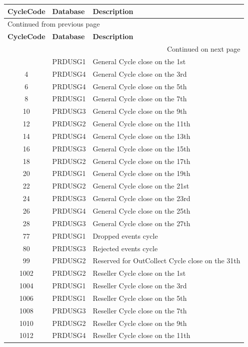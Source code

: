 \documentclass[12pt,twoside]{article}
\begin{document}
\begin{longtable}{c|l|l}
\hline
\textbf{CycleCode} & \textbf{Database} & \textbf{Description}\\
\hline
\endfirsthead
\multicolumn{3}{l}{Continued from previous page} \\
\hline

\textbf{CycleCode} & \textbf{Database} & \textbf{Description} \\

\hline
\endhead
\hline\multicolumn{3}{r}{Continued on next page} \\
\endfoot
\endlastfoot
\hline
2 & PRDUSG1 & General Cycle close on the 1st\\
4 & PRDUSG4 & General Cycle close on the 3rd\\
6 & PRDUSG4 & General Cycle close on the 5th\\
8 & PRDUSG1 & General Cycle close on the 7th\\
10 & PRDUSG3 & General Cycle close on the 9th\\
12 & PRDUSG2 & General Cycle close on the 11th\\
14 & PRDUSG4 & General Cycle close on the 13th\\
16 & PRDUSG3 & General Cycle close on the 15th\\
18 & PRDUSG2 & General Cycle close on the 17th\\
20 & PRDUSG1 & General Cycle close on the 19th\\
22 & PRDUSG2 & General Cycle close on the 21st\\
24 & PRDUSG3 & General Cycle close on the 23rd\\
26 & PRDUSG4 & General Cycle close on the 25th\\
28 & PRDUSG3 & General Cycle close on the 27th\\
77 & PRDUSG1 & Dropped events cycle\\
80 & PRDUSG3 & Rejected events cycle\\
99 & PRDUSG2 & Reserved for OutCollect Cycle close on the 31th\\
1002 & PRDUSG2 & Reseller Cycle close on the 1st\\
1004 & PRDUSG1 & Reseller Cycle close on the 3rd\\
1006 & PRDUSG1 & Reseller Cycle close on the 5th\\
1008 & PRDUSG3 & Reseller Cycle close on the 7th\\
1010 & PRDUSG2 & Reseller Cycle close on the 9th\\
1012 & PRDUSG4 & Reseller Cycle close on the 11th\\

\end{longtable}
\end{document}
